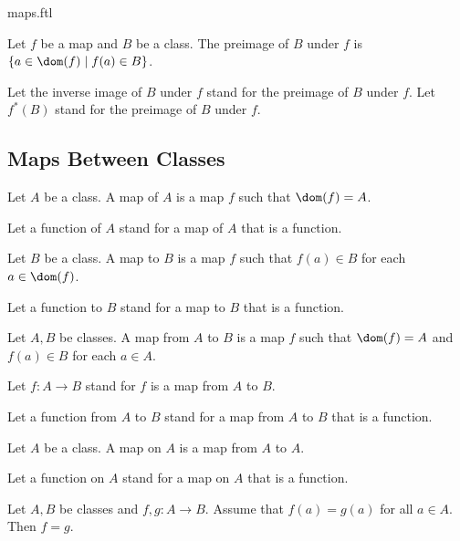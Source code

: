 \documentclass{naproche-library}
\begin{document}
\begin{smodule}{maps.ftl}
  \begin{definition}[forthel,id=FOUNDATIONS_06_4563167805964288]
    Let $f$ be a map and $B$ be a class.
    The preimage of $B$ under $f$ is $\{ a \in \dom(f) \mid f(a) \in B \}$.

    Let the inverse image of $B$ under $f$ stand for the preimage of $B$ under $f$.
    Let $f^{*}(B)$ stand for the preimage of $B$ under $f$.
  \end{definition}


  \subsection*{Maps Between Classes}

  \begin{definition}[forthel,id=FOUNDATIONS_06_6934038600220672]
    Let $A$ be a class.
    A map of $A$ is a map $f$ such that $\dom(f) = A$.

    Let a function of $A$ stand for a map of $A$ that is a function.
  \end{definition}

  \begin{definition}[forthel,id=FOUNDATIONS_06_7725375157174272]
    Let $B$ be a class.
    A map to $B$ is a map $f$ such that $f(a) \in B$ for each $a \in \dom(f)$.

    Let a function to $B$ stand for a map to $B$ that is a function.
  \end{definition}

  \begin{definition}[forthel,id=FOUNDATIONS_06_2823507398361088]
    Let $A, B$ be classes.
    A map from $A$ to $B$ is a map $f$ such that $\dom(f) = A$ and $f(a) \in B$ for each $a \in A$.

    Let $f: A \to B$ stand for $f$ is a map from $A$ to $B$.

    Let a function from $A$ to $B$ stand for a map from $A$ to $B$ that is a function.
  \end{definition}

  \begin{definition}[forthel,id=FOUNDATIONS_06_3390734908522496]
    Let $A$ be a class.
    A map on $A$ is a map from $A$ to $A$.

    Let a function on $A$ stand for a map on $A$ that is a function.
  \end{definition}

  \begin{proposition}[forthel,id=FOUNDATIONS_06_3312973569327104]
    Let $A, B$ be classes and $f, g : A \to B$.
    Assume that $f(a) = g(a)$ for all $a \in A$.
    Then $f = g$.
  \end{proposition}


\end{smodule}
\end{document}
